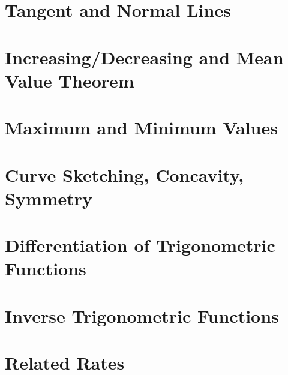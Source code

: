 \documentclass[10pt]{article}  %
\begin{document}
\section{Tangent and Normal Lines}


\section{Increasing/Decreasing and Mean Value Theorem}


\section{Maximum and Minimum Values}


\section{Curve Sketching, Concavity, Symmetry}


\section{Differentiation of Trigonometric Functions}


\section{Inverse Trigonometric Functions}


\section{Related Rates}

\end{document}
